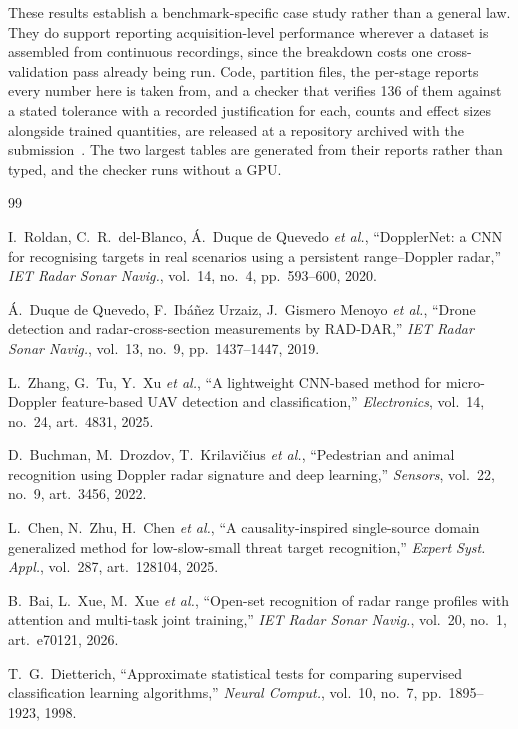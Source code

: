\documentclass[11pt,a4paper]{article}
\newcommand{\codeurl}{a repository archived with the submission}
\newcommand{\codeurl}{\url{https://github.com/falcon-colab/rdrd-acquisition-coverage}}
\begin{document}
These results establish a benchmark-specific case study rather than a general law. They do support reporting acquisition-level performance wherever a dataset is assembled from continuous recordings, since the breakdown costs one cross-validation pass already being run. Code, partition files, the per-stage reports every number here is taken from, and a checker that verifies 136 of them against a stated tolerance with a recorded justification for each, counts and effect sizes alongside trained quantities, are released at \codeurl{}~\cite{dataset2026}. The two largest tables are generated from their reports rather than typed, and the checker runs without a GPU.


{\small
\begin{thebibliography}{99}
\itemsep1pt \parskip0pt 

 I.~Roldan, C.~R.~del-Blanco, \'A.~Duque de Quevedo \emph{et al.}, ``DopplerNet: a CNN for recognising targets in real scenarios using a persistent range--Doppler radar,'' \emph{IET Radar Sonar Navig.}, vol.~14, no.~4, pp.~593--600, 2020.

 \'A.~Duque de Quevedo, F.~Ib\'a\~nez Urzaiz, J.~Gismero Menoyo \emph{et al.}, ``Drone detection and radar-cross-section measurements by RAD-DAR,'' \emph{IET Radar Sonar Navig.}, vol.~13, no.~9, pp.~1437--1447, 2019.

 L.~Zhang, G.~Tu, Y.~Xu \emph{et al.}, ``A lightweight CNN-based method for micro-Doppler feature-based UAV detection and classification,'' \emph{Electronics}, vol.~14, no.~24, art.~4831, 2025.

 D.~Buchman, M.~Drozdov, T.~Krilavi\v{c}ius \emph{et al.}, ``Pedestrian and animal recognition using Doppler radar signature and deep learning,'' \emph{Sensors}, vol.~22, no.~9, art.~3456, 2022.

 L.~Chen, N.~Zhu, H.~Chen \emph{et al.}, ``A causality-inspired single-source domain generalized method for low-slow-small threat target recognition,'' \emph{Expert Syst. Appl.}, vol.~287, art.~128104, 2025.

 B.~Bai, L.~Xue, M.~Xue \emph{et al.}, ``Open-set recognition of radar range profiles with attention and multi-task joint training,'' \emph{IET Radar Sonar Navig.}, vol.~20, no.~1, art.~e70121, 2026.

 T.~G.~Dietterich, ``Approximate statistical tests for comparing supervised classification learning algorithms,'' \emph{Neural Comput.}, vol.~10, no.~7, pp.~1895--1923, 1998.


\end{thebibliography}}
\end{document}
